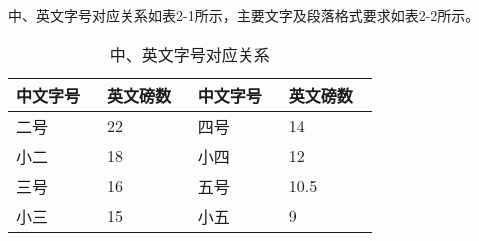 中、英文字号对应关系如表2-1所示，主要文字及段落格式要求如表2-2所示。

\begin{table}[!h]
  \centering
  \caption{中、英文字号对应关系}
  \label{tab:fontsize}
  \begin{tabular*}{\linewidth}{C{0.22\linewidth}C{0.22\linewidth}C{0.22\linewidth}C{0.22\linewidth}}
    \toprule
    中文字号 & 英文磅数 & 中文字号 & 英文磅数  \\
    \midrule
    二号     & 22     & 四号 & 14 \\
    小二     & 18     & 小四 & 12 \\
    三号     & 16     & 五号 & 10.5 \\
    小三     & 15     & 小五 & 9 \\
    \bottomrule
  \end{tabular*}
\end{table}

